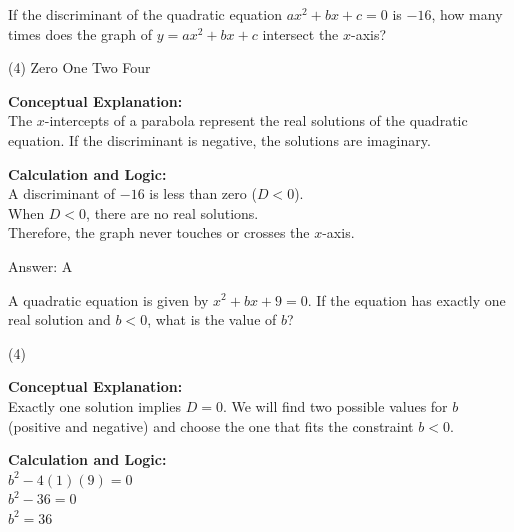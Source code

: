 \documentclass[11pt,paper=a4,answers]{exam}
\begin{document}
\begin{questions}
\question
If the discriminant of the quadratic equation $ax^2 + bx + c = 0$ is $-16$, how many times does the graph of $y = ax^2 + bx + c$ intersect the $x$-axis?
\begin{tasks}(4)
    \task Zero
    \task One
    \task Two
    \task Four
\end{tasks}

\begin{solution}
\textbf{Conceptual Explanation:} \\
The $x$-intercepts of a parabola represent the real solutions of the quadratic equation. If the discriminant is negative, the solutions are imaginary.

\vspace{20pt}

\textbf{Calculation and Logic:} \\
A discriminant of $-16$ is less than zero ($D < 0$). \\
When $D < 0$, there are no real solutions. \\
Therefore, the graph never touches or crosses the $x$-axis.

\vspace{25pt}

Answer: \colorbox{yellow!100}{A}
\end{solution}

\vspace{40pt}

\question
A quadratic equation is given by $x^2 + bx + 9 = 0$. If the equation has exactly one real solution and $b < 0$, what is the value of $b$?
\begin{tasks}(4)
\end{tasks}

\begin{solution}
\textbf{Conceptual Explanation:} \\
Exactly one solution implies $D = 0$. We will find two possible values for $b$ (positive and negative) and choose the one that fits the constraint $b < 0$.

\vspace{20pt}

\textbf{Calculation and Logic:} \\
$b^2 - 4(1)(9) = 0$ \\
$b^2 - 36 = 0$ \\
$b^2 = 36$


\end{solution}
\end{questions}
\end{document}
